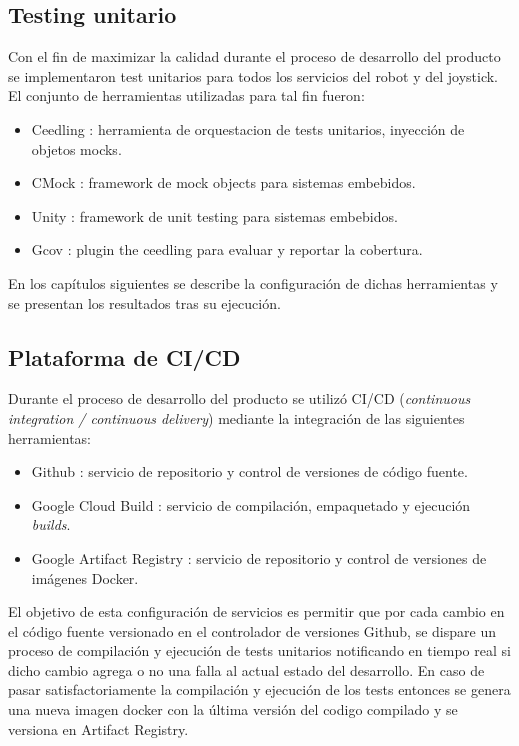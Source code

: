 

\subsection{Testing unitario}
Con el fin de maximizar la calidad durante el proceso de desarrollo del producto se implementaron test unitarios para todos los servicios del robot y del joystick. El conjunto de herramientas utilizadas para tal fin fueron:
\begin{itemize}
	\item Ceedling \cite{SoftwareTool_Ceedling}: herramienta de orquestacion de tests unitarios, inyección de objetos mocks.
	\item CMock \cite{SoftwareTool_CMock}: framework de mock objects para sistemas embebidos.
	\item Unity \cite{SoftwareTool_Unity}: framework de unit testing para sistemas embebidos.
	\item Gcov \cite{SoftwareTool_CeedlingGCov}: plugin the ceedling para evaluar y reportar la cobertura.
\end{itemize}

En los capítulos siguientes se describe la configuración de dichas herramientas y se presentan los resultados tras su ejecución.

\subsection{Plataforma de CI/CD}
Durante el proceso de desarrollo del producto se utilizó CI/CD (\textit{continuous integration / continuous delivery}) mediante la integración de las siguientes herramientas:

\begin{itemize}
	\item Github \cite{SoftwareTool_Github}: servicio de repositorio y control de versiones de código fuente.
	\item Google Cloud Build \cite{SoftwareTool_CloudBuild}: servicio de compilación, empaquetado y ejecución \textit{builds}.
	\item Google Artifact Registry \cite{SoftwareTool_ArtifactRegistry}: servicio de repositorio y control de versiones de imágenes Docker.
\end{itemize}

El objetivo de esta configuración de servicios es permitir que por cada cambio en el código fuente versionado en el controlador de versiones Github, se dispare un proceso de compilación y ejecución de tests unitarios notificando en tiempo real si dicho cambio agrega o no una falla al actual estado del desarrollo. En caso de pasar satisfactoriamente la compilación y ejecución de los tests entonces se genera una nueva imagen docker con la última versión del codigo compilado y se versiona en Artifact Registry.

